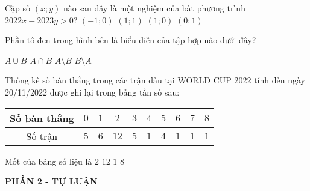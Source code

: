 \begin{ex}%
	Cặp số $(x;y)$ nào sau đây là một nghiệm của bất phương trình $2022x-2023y>0$?
	\choice
	{$(-1;0)$}
	{$(1;1)$}
	{\True $(1;0)$}
	{$(0;1)$}
\end{ex}

\begin{ex}%
	Phần tô đen trong hình bên là biểu diễn của tập hợp nào dưới đây?
	\begin{center}
	\end{center}
	\choice
	{\True $A\cup B$}
	{$A\cap B$}
	{$A\setminus B$}
	{$B\setminus A$}
\end{ex}

\begin{ex}%
	Thống kê số bàn thắng trong các trận đấu tại WORLD CUP 2022 tính đến ngày 20/11/2022 được ghi lại trong bảng tần số sau:
	\begin{center}
	\begin{tabular}{|c|c|c|c|c|c|c|c|c|c|}
	\hline
	Số bàn thắng &$0$ &$1$&$2$&$3$&$4$&$5$&$6$&$7$&$8$\\
	\hline
	Số trận &$5$&$6$&$12$&$5$&$1$&$4$&$1$&$1$&$1$\\
	\hline
	\end{tabular}
	\end{center}
	Mốt của bảng số liệu là
	\choice
	{\True $2$}
	{$12$}
	{$1$}
	{$8$}
\end{ex}

\begin{center}
	\textbf{PHẦN 2 - TỰ LUẬN}
\end{center}


